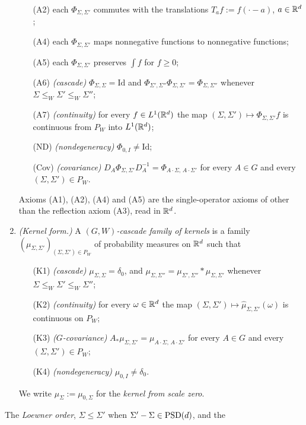 \begin{definition}
\begin{enumerate}
\begin{enumerate}
\item[(A2)] each $\Phi_{\Sigma,\Sigma'}$ commutes with the translations $T_af := f(\cdot - a)$,
$a \in \RR^d$;
\item[(A4)] each $\Phi_{\Sigma,\Sigma'}$ maps nonnegative functions to nonnegative functions;
\item[(A5)] each $\Phi_{\Sigma,\Sigma'}$ preserves $\int f$ for $f \ge 0$;
\item[(A6)] \emph{(cascade)} $\Phi_{\Sigma,\Sigma} = \mathrm{Id}$ and
$\Phi_{\Sigma',\Sigma''}\Phi_{\Sigma,\Sigma'} = \Phi_{\Sigma,\Sigma''}$ whenever
$\Sigma \le_W \Sigma' \le_W \Sigma''$;
\item[(A7)] \emph{(continuity)} for every $f \in L^1(\RR^d)$ the map $(\Sigma,\Sigma') \mapsto \Phi_{\Sigma,\Sigma'}f$
is continuous from $P_W$ into $L^1(\RR^d)$;
\item[(ND)] \emph{(nondegeneracy)} $\Phi_{0,I} \ne \mathrm{Id}$;
\item[(Cov)] \emph{(covariance)} $D_A\Phi_{\Sigma,\Sigma'}D_A^{-1} = \Phi_{A\cdot\Sigma,\,A\cdot\Sigma'}$ for every
$A \in G$ and every $(\Sigma,\Sigma') \in P_W$.
\end{enumerate}
Axioms (A1), (A2), (A4) and (A5) are the single-operator axioms of
 other than the reflection axiom (A3), read in $\RR^d$.
\item \emph{(Kernel form.)} A \emph{$(G, W)$-cascade family of kernels} is a family
$(\mu_{\Sigma,\Sigma'})_{(\Sigma,\Sigma') \in P_W}$ of probability measures on $\RR^d$ such that
\begin{enumerate}
\item[(K1)] \emph{(cascade)} $\mu_{\Sigma,\Sigma} = \delta_0$, and
$\mu_{\Sigma,\Sigma''} = \mu_{\Sigma',\Sigma''} * \mu_{\Sigma,\Sigma'}$ whenever
$\Sigma \le_W \Sigma' \le_W \Sigma''$;
\item[(K2)] \emph{(continuity)} for every $\omega \in \mathbb{R}^d$ the map
$(\Sigma,\Sigma') \mapsto \widehat\mu_{\Sigma,\Sigma'}(\omega)$ is continuous on $P_W$;
\item[(K3)] \emph{($G$-covariance)} $A_*\mu_{\Sigma,\Sigma'} = \mu_{A\cdot\Sigma,\,A\cdot\Sigma'}$ for
every $A \in G$ and every $(\Sigma,\Sigma') \in P_W$;
\item[(K4)] \emph{(nondegeneracy)} $\mu_{0,I} \ne \delta_0$.
\end{enumerate}
We write $\mu_\Sigma := \mu_{0,\Sigma}$ for the \emph{kernel from scale zero}.
\end{enumerate}
The \emph{Loewner order}, $\Sigma \le \Sigma'$ when $\Sigma' - \Sigma \in \mathrm{PSD}(d)$, and the

\end{definition}
